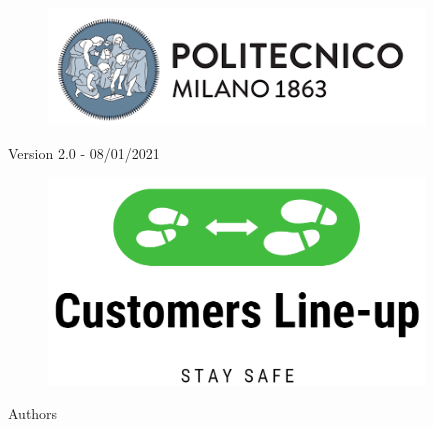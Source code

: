 \thispagestyle{empty}
\begin{center}

    \begin{figure}[!h] 
    \centering
    \includegraphics[width=100mm]{./Images/Polimilogo} 
     \end{figure}
    { \small {\mycourse} \par}
\vspace{0.3\baselineskip}
    {\bf \large{\mydep} \par}
\vspace{\baselineskip}
    { \Large {\bfseries {\mytitle}} \par}
\vspace{0.5\baselineskip}
	{ \small {Version 2.0 - 08/01/2021} \par}
\vspace{\baselineskip}
	\begin{figure}[!h] 
    \centering
    \includegraphics[width=100mm]{./Images/MockupLogo/LogoEnorme} 
     \end{figure}
\vspace{0.7\baselineskip}
\vspace{\baselineskip} 
    {Authors \par}
\vspace{0.4\baselineskip}
    {{\large {\bf \myname \\ \myrollno}} \par}

\end{center}
